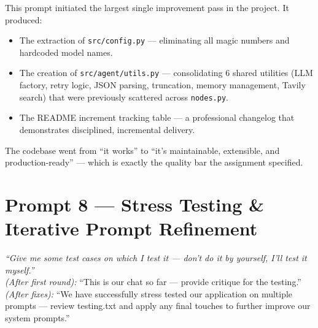 \documentclass[12pt, a4paper]{article}
\begin{document}
\begin{impactbox}
This prompt initiated the largest single improvement pass in the project. It produced:
\begin{itemize}[leftmargin=1.5em]
    \item The extraction of \texttt{src/config.py} — eliminating all magic numbers and hardcoded model names.
    \item The creation of \texttt{src/agent/utils.py} — consolidating 6 shared utilities (LLM factory, retry logic, JSON parsing, truncation, memory management, Tavily search) that were previously scattered across \texttt{nodes.py}.
    \item The README increment tracking table — a professional changelog that demonstrates disciplined, incremental delivery.
\end{itemize}

The codebase went from ``it works'' to ``it's maintainable, extensible, and production-ready'' — which is exactly the quality bar the assignment specified.
\end{impactbox}

\section{Prompt 8 — Stress Testing \& Iterative Prompt Refinement}

\begin{promptbox}
\textit{``Give me some test cases on which I test it — don't do it by yourself, I'll test it myself.''} \\[4pt]
\textit{(After first round):} ``This is our chat so far — provide critique for the testing.'' \\[4pt]
\textit{(After fixes):} ``We have successfully stress tested our application on multiple prompts — review testing.txt and apply any final touches to further improve our system prompts.''
\end{promptbox}
\end{document}
